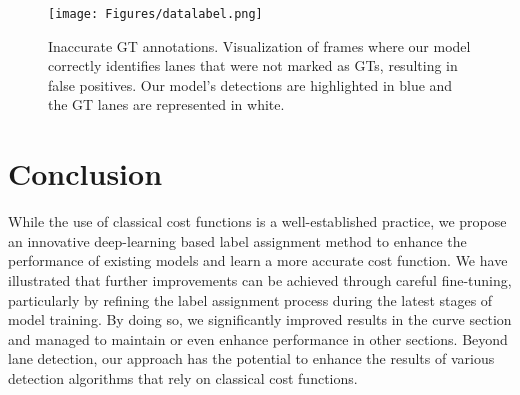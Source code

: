 \documentclass[10pt,twocolumn,letterpaper]{article}
\begin{document}
\begin{figure}[t]
\begin{center}
    \centering
    \texttt{[image: Figures/datalabel.png]}
\caption{Inaccurate GT annotations. Visualization of frames where our model correctly identifies lanes that were not marked as GTs, resulting in false positives. Our model's detections are highlighted in blue and the GT lanes are represented in white.}
\label{gtlabel}
\end{center}
\end{figure}
\section{Conclusion}
   While the use of classical cost functions is a well-established practice, we propose an innovative deep-learning based label assignment method to enhance the performance of existing models and learn a more accurate cost function. We have illustrated that further improvements can be achieved through careful fine-tuning, particularly by refining the label assignment process during the latest stages of model training. By doing so, we significantly improved results in the curve section and managed to maintain or even enhance performance in other sections. Beyond lane detection, our approach has the potential to enhance the results of various detection algorithms that rely on classical cost functions.

\clearpage
{\small


}
\end{document}
